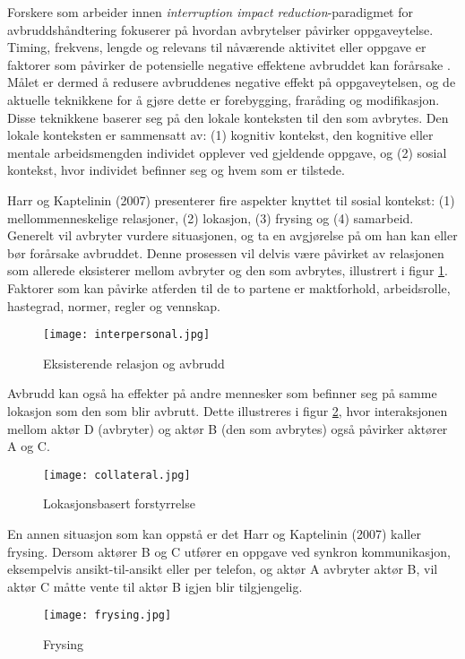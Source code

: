 \noindent
Forskere som arbeider innen \emph{interruption impact reduction}-paradigmet for avbruddshåndtering fokuserer på hvordan avbrytelser påvirker oppgaveytelse. Timing, frekvens, lengde og relevans til nåværende aktivitet eller oppgave er faktorer som påvirker de potensielle negative effektene avbruddet kan forårsake \citep{Grandhi10, Harr07}.
Målet er dermed å redusere avbruddenes negative effekt på oppgaveytelsen, og de aktuelle teknikkene for å gjøre dette er forebygging, fraråding og modifikasjon. Disse teknikkene baserer seg på den lokale konteksten til den som avbrytes. Den lokale konteksten er sammensatt av: (1) kognitiv kontekst, den kognitive eller mentale arbeidsmengden individet opplever ved gjeldende oppgave, og (2) sosial kontekst, hvor individet befinner seg og hvem som er tilstede. 
 
\noindent
Harr og Kaptelinin (2007) presenterer fire aspekter knyttet til sosial kontekst: (1) mellommenneskelige relasjoner, (2) lokasjon, (3) frysing og (4) samarbeid.
\noindent
Generelt vil avbryter vurdere situasjonen, og ta en avgjørelse på om han kan eller bør forårsake avbruddet. Denne prosessen vil delvis være påvirket av relasjonen som allerede eksisterer mellom avbryter og den som avbrytes, illustrert i figur \ref{interpersonal}. Faktorer som kan påvirke atferden til de to partene er maktforhold, arbeidsrolle, hastegrad, normer, regler og vennskap. 
\begin{figure}[H]
\centering
\texttt{[image: interpersonal.jpg]}
\caption{Eksisterende relasjon og avbrudd}
\label{interpersonal}
\end{figure}

\noindent
Avbrudd kan også ha effekter på andre mennesker som befinner seg på samme lokasjon som den som blir avbrutt. Dette illustreres i figur \ref{collateral}, hvor interaksjonen mellom aktør D (avbryter) og aktør B (den som avbrytes) også påvirker aktører A og C.
\begin{figure}[H]
\centering
\texttt{[image: collateral.jpg]}
\caption{Lokasjonsbasert forstyrrelse}
\label{collateral}
\end{figure}

\noindent
En annen situasjon som kan oppstå er det Harr og Kaptelinin (2007) kaller frysing. Dersom aktører B og C utfører en oppgave ved synkron kommunikasjon, eksempelvis ansikt-til-ansikt eller per telefon, og aktør A avbryter aktør B, vil aktør C måtte vente til aktør B igjen blir tilgjengelig. 
\begin{figure}[H]
\centering
\texttt{[image: frysing.jpg]}
\caption{Frysing}
\label{frysing}
\end{figure}

